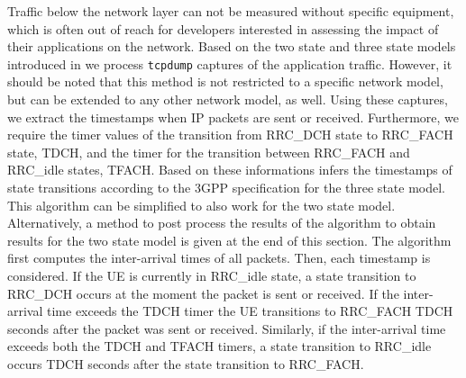 Traffic below the network layer can not be measured without specific equipment, which is often out of reach for developers interested in assessing the impact of their applications on the network.
Based on the two state and three state models introduced in  we process \texttt{tcpdump} captures of the application traffic.
However, it should be noted that this method is not restricted to a specific network model, but can be extended to any other network model, as well.
Using these captures, we extract the timestamps when \gls{IP} packets are sent or received.
Furthermore, we require the timer values of the transition from \gls{RRC_DCH} state to \gls{RRC_FACH} state, \gls{TDCH}, and the timer for the transition between \gls{RRC_FACH} and \gls{RRC_idle} states, \gls{TFACH}.
Based on these informations  infers the timestamps of state transitions according to the \gls{3GPP} specification \cite{3GPP_RRC_Spec} for the three state model.
This algorithm can be simplified to also work for the two state model. 
Alternatively, a method to post process the results of the algorithm to obtain results for the two state model is given at the end of this section.
The algorithm first computes the inter-arrival times of all packets.
Then, each timestamp is considered.
If the \gls{UE} is currently in \gls{RRC_idle} state, a state transition to \gls{RRC_DCH} occurs at the moment the packet is sent or received.
If the inter-arrival time exceeds the \gls{TDCH} timer the \gls{UE} transitions to \gls{RRC_FACH} \gls{TDCH} seconds after the packet was sent or received.
Similarly, if the inter-arrival time exceeds both the \gls{TDCH} and \gls{TFACH} timers, a state transition to \gls{RRC_idle} occurs \gls{TDCH} seconds after the state transition to \gls{RRC_FACH}.


